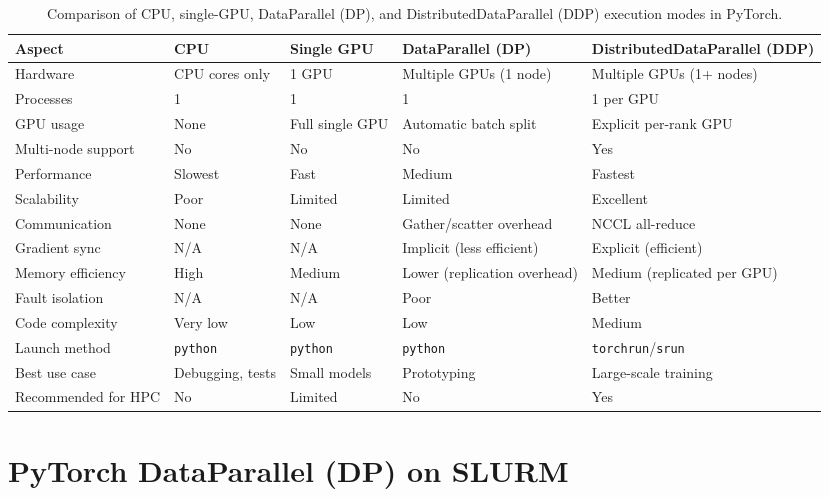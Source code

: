 \documentclass[11pt]{article}
\begin{document}
\begin{table}[H]
\centering
\small
\renewcommand{\arraystretch}{1.2}
\setlength{\tabcolsep}{4pt}

\begin{tabularx}{\textwidth}{@{}lXXXX@{}}
\toprule
\textbf{Aspect} 
& \textbf{CPU} 
& \textbf{Single GPU} 
& \textbf{DataParallel (DP)} 
& \textbf{DistributedDataParallel (DDP)} \\
\midrule

Hardware & CPU cores only & 1 GPU & Multiple GPUs (1 node) & Multiple GPUs (1+ nodes) \\
Processes & 1 & 1 & 1 & 1 per GPU \\
GPU usage & None & Full single GPU & Automatic batch split & Explicit per-rank GPU \\
Multi-node support & No & No & No & Yes \\
Performance & Slowest & Fast & Medium & Fastest \\
Scalability & Poor & Limited & Limited & Excellent \\
Communication & None & None & Gather/scatter overhead & NCCL all-reduce \\
Gradient sync & N/A & N/A & Implicit (less efficient) & Explicit (efficient) \\
Memory efficiency & High & Medium & Lower (replication overhead) & Medium (replicated per GPU) \\
Fault isolation & N/A & N/A & Poor & Better \\
Code complexity & Very low & Low & Low & Medium \\
Launch method & \texttt{python} & \texttt{python} & \texttt{python} & \texttt{torchrun}/\texttt{srun} \\
Best use case & Debugging, tests & Small models & Prototyping & Large-scale training \\
Recommended for HPC & No & Limited & No & Yes \\
\bottomrule
\end{tabularx}

\caption{Comparison of CPU, single-GPU, DataParallel (DP), and DistributedDataParallel (DDP) execution modes in PyTorch.}
\label{tab:cpu-gpu-dp-ddp}
\end{table}


\section{PyTorch DataParallel (DP) on SLURM}
\label{sec:dp}
\end{document}
